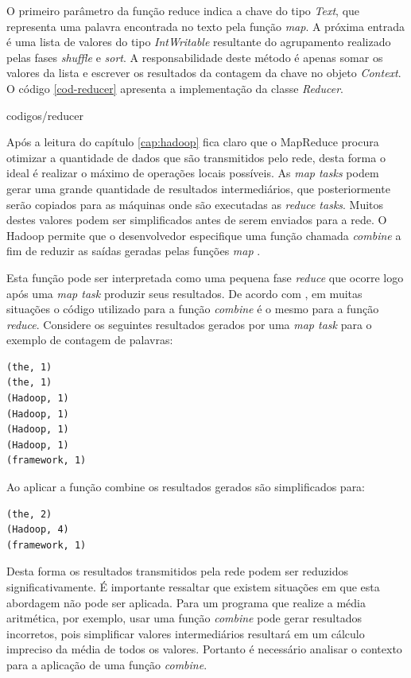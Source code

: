 O primeiro parâmetro da função reduce indica a chave do tipo \textit{Text}, que representa uma palavra encontrada no texto pela função \textit{map}. A próxima entrada é uma lista de valores do tipo \textit{IntWritable} resultante do agrupamento realizado pelas fases \textit{shuffle} e \textit{sort}. A responsabilidade deste método é apenas somar os valores da lista e escrever os resultados da contagem da chave no objeto \textit{Context}. O código \ref{cod-reducer} apresenta a implementação da classe \textit{Reducer}.


		{codigos/reducer}

Após a leitura do capítulo \ref{cap:hadoop} fica claro que o MapReduce procura otimizar a quantidade de dados que são transmitidos pelo rede, desta forma o ideal é realizar o máximo de operações locais possíveis. As \textit{map tasks} podem gerar uma grande quantidade de resultados intermediários, que posteriormente serão copiados para as máquinas onde são executadas as \textit{reduce tasks}. Muitos destes valores podem ser simplificados antes de serem enviados para a rede. O Hadoop permite que o desenvolvedor especifique uma função chamada \textit{combine} a fim de reduzir as saídas geradas pelas funções \textit{map} \cite{white2012}.

Esta função pode ser interpretada como uma pequena fase \textit{reduce} que ocorre logo após uma \textit{map task} produzir seus resultados. De acordo com , em muitas situações o código utilizado para a função \textit{combine} é o mesmo para a função \textit{reduce}. Considere os seguintes resultados gerados por uma \textit{map task} para o exemplo de contagem de palavras:

\begin{lstlisting}[style=abnt,frame=none]
(the, 1)
(the, 1)
(Hadoop, 1)
(Hadoop, 1)
(Hadoop, 1)
(Hadoop, 1)
(framework, 1)
\end{lstlisting}

Ao aplicar a função combine os resultados gerados são simplificados para:

\begin{lstlisting}[style=abnt,frame=none]
(the, 2)
(Hadoop, 4)
(framework, 1)
\end{lstlisting}

Desta forma os resultados transmitidos pela rede podem ser reduzidos significativamente. É importante ressaltar que existem situações em que esta abordagem não pode ser aplicada. Para um programa que realize a média aritmética, por exemplo, usar uma função \textit{combine} pode gerar resultados incorretos, pois simplificar valores intermediários resultará em um cálculo impreciso da média de todos os valores. Portanto é necessário analisar o contexto para a aplicação de uma função \textit{combine}.

